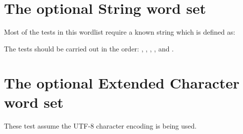 

\section{The optional String word set} %

Most of the tests in this wordlist require a known string which is
defined as:


The tests should be carried out in the order:
,
, \linebreak
{},
,
 and \linebreak
{}.



\section{The optional Extended Character word set} %

These test assume the UTF-8 character encoding is being used.





\endinput %

\section{Test Harness} %

